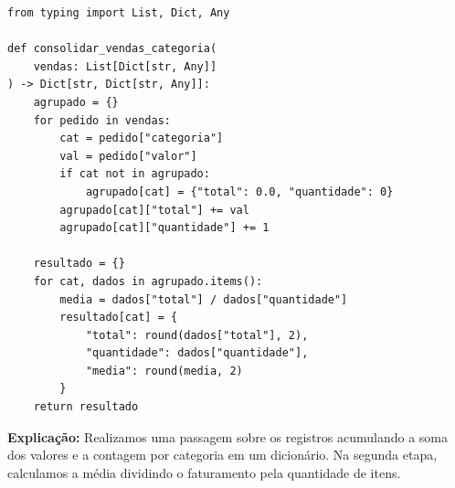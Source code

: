 \ifmostrarGabarito
\begin{verbatim}
from typing import List, Dict, Any

def consolidar_vendas_categoria(
    vendas: List[Dict[str, Any]]
) -> Dict[str, Dict[str, Any]]:
    agrupado = {}
    for pedido in vendas:
        cat = pedido["categoria"]
        val = pedido["valor"]
        if cat not in agrupado:
            agrupado[cat] = {"total": 0.0, "quantidade": 0}
        agrupado[cat]["total"] += val
        agrupado[cat]["quantidade"] += 1
        
    resultado = {}
    for cat, dados in agrupado.items():
        media = dados["total"] / dados["quantidade"]
        resultado[cat] = {
            "total": round(dados["total"], 2),
            "quantidade": dados["quantidade"],
            "media": round(media, 2)
        }
    return resultado
\end{verbatim}

\textbf{Explicação:}
Realizamos uma passagem sobre os registros acumulando a soma dos valores e a contagem por categoria em um dicionário. Na segunda etapa, calculamos a média dividindo o faturamento pela quantidade de itens.
\else
{}
\clearpage
{}
\clearpage
\fi
